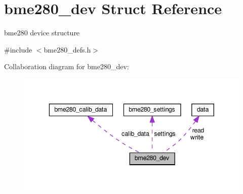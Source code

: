 \hypertarget{structbme280__dev}{}\section{bme280\+\_\+dev Struct Reference}
\label{structbme280__dev}


bme280 device structure  




{\ttfamily \#include $<$bme280\+\_\+defs.\+h$>$}



Collaboration diagram for bme280\+\_\+dev\+:
\nopagebreak
\begin{figure}[H]
\begin{center}
\leavevmode
\includegraphics[width=343pt]{structbme280__dev__coll__graph}
\end{center}
\end{figure}
